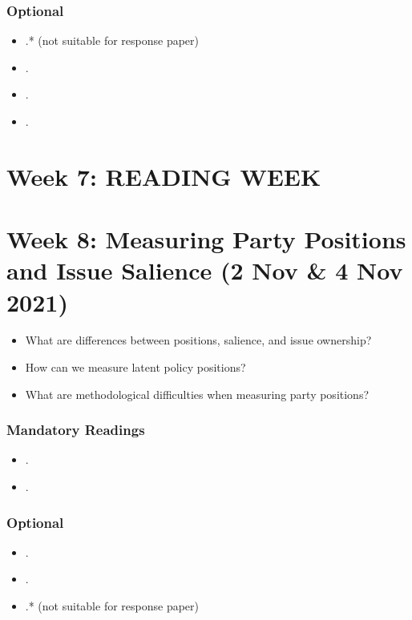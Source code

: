 \documentclass[abstract=on,parskip=full,headings=standardclasses,fontsize=11pt,paper=a4]{scrartcl}
\begin{document}
\subsubsection*{Optional}
\begin{itemize}
\item {}.* (not suitable for response paper)
\item {}.
\item {}.
\item {}.
\end{itemize}

\section{Week 7:  READING WEEK}



\section{Week 8:  Measuring Party Positions and Issue Salience (2 Nov \& 4 Nov 2021)}


\begin{itemize}
\renewcommand\labelitemi{--}
\item What are differences between positions, salience, and issue ownership?
\item How can we measure latent policy positions? 
\item What are methodological difficulties when measuring party positions?
\end{itemize}

\subsubsection*{Mandatory Readings}
\begin{itemize}
\item {}.
\item {}.
\end{itemize}


\subsubsection*{Optional}
\begin{itemize}
\item {}.
\item {}.
\item {}.*  (not suitable for response paper)
\end{itemize}
\end{document}
